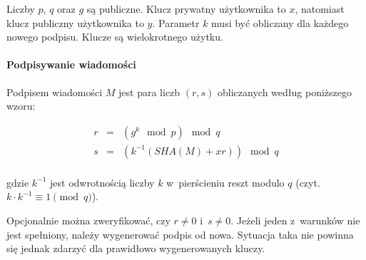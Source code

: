 \documentclass{article}
\begin{document}
        Liczby $p$, $q$ oraz $g$ są publiczne. Klucz prywatny użytkownika to $x$, natomiast klucz publiczny użytkownika to $y$. Parametr $k$ musi być obliczany dla każdego nowego podpisu. Klucze są wielokrotnego użytku.
        
        \paragraph*{Podpisywanie wiadomości} Podpisem wiadomości $M$ jest para liczb $(r, s)$ obliczanych według poniższego wzoru:
        
        \begin{equation*}
            \begin{array}{lcl}
                r & = & (g^{k} \mod p) \mod q \\
                s & = & (k^{-1} (SHA(M) + xr)) \mod q \\
            \end{array}
        \end{equation*}
        
        \noindent gdzie $k^{-1}$ jest odwrotnością liczby $k$ w~pierścieniu reszt modulo $q$ (czyt. $k \cdot k^{-1} \equiv 1 \pmod q$). 
        
        Opcjonalnie można zweryfikować, czy $r \neq 0$ i~$s \neq 0$. Jeżeli jeden z~warunków nie jest spełniony, należy wygenerować podpis od nowa. Sytuacja taka nie powinna się jednak zdarzyć dla prawidłowo wygenerowanych kluczy.
        
\end{document}
